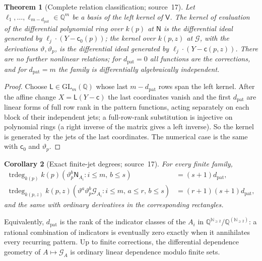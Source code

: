 \documentclass[11pt]{article}
\numberwithin{equation}{section}
\newtheorem{theorem}{Theorem}[section]
\newtheorem{corollary}[theorem]{Corollary}
\theoremstyle{definition}
\theoremstyle{remark}
\newcommand{\Q}{\mathbb Q}
\newcommand{\N}{\mathbb N}
\newcommand{\trdeg}{\operatorname{trdeg}}
\begin{document}
\begin{theorem}[Complete relation classification; source~17]
\label{hol:fh:thm:relations}
Let $\boldsymbol\ell_1,\ldots,\boldsymbol\ell_{m-d_{\mathrm{pat}}}\in\Q^m$ be a
basis of the left kernel of $\mathsf V$. The kernel of evaluation of the
differential polynomial ring over $k(p)$ at $\boldsymbol{\mathsf N}$ is the
differential ideal generated by $\boldsymbol\ell_j\cdot(Y-\mathsf c_0(p))$; the
kernel over $k(p,z)$ at $\boldsymbol{\mathcal G}$, with the derivations
$\vartheta,\vartheta_p$, is the differential ideal generated by
$\boldsymbol\ell_j\cdot(Y-\mathsf c(p,z))$. There are no further nonlinear
relations; for $d_{\mathrm{pat}}=0$ all functions are the corrections, and for
$d_{\mathrm{pat}}=m$ the family is differentially algebraically independent.
\end{theorem}

\begin{proof}
Choose $\mathsf L\in\mathrm{GL}_m(\Q)$ whose last $m-d_{\mathrm{pat}}$ rows span
the left kernel. After the affine change $X=\mathsf L(Y-\mathsf c)$ the last
coordinates vanish and the first $d_{\mathrm{pat}}$ are linear forms of full
row rank in the pattern functions, acting separately on each block of their
independent jets; a full-row-rank substitution is injective on polynomial
rings (a right inverse of the matrix gives a left inverse). So the kernel is
generated by the jets of the last coordinates. The numerical case is the same
with $\mathsf c_0$ and $\vartheta_p$.
\end{proof}

\begin{corollary}[Exact finite-jet degrees; source~17]
\label{hol:fh:cor:jetdegree}
For every finite family,
\begin{align*}
 \trdeg_{k(p)}k(p)(\vartheta_p^b\mathsf N_{A_i}:i\le m,\,b\le s)
 &=(s+1)d_{\mathrm{pat}},\\
 \trdeg_{k(p,z)}k(p,z)(\vartheta^a\vartheta_p^b\mathcal G_{A_i}:i\le m,\,a\le r,\,
 b\le s)&=(r+1)(s+1)d_{\mathrm{pat}},
\end{align*}
and the same with ordinary derivatives in the corresponding rectangles.
\end{corollary}

Equivalently, $d_{\mathrm{pat}}$ is the rank of the indicator classes of the
$A_i$ in $\Q^{\N_{\ge2}}/\Q^{(\N_{\ge2})}$: a rational combination of
indicators is eventually zero exactly when it annihilates every recurring
pattern. Up to finite corrections, the differential dependence geometry of
$A\mapsto\mathcal G_A$ is ordinary linear dependence modulo finite sets.
\end{document}
